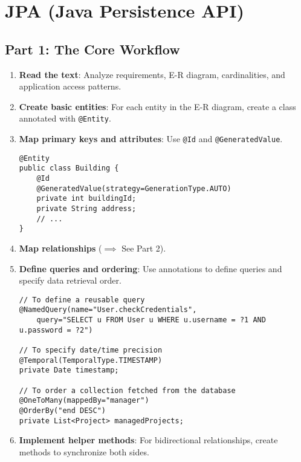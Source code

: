 
\section*{JPA (Java Persistence API)}

\subsection*{Part 1: The Core Workflow}
\begin{enumerate}
    \item \textbf{Read the text}: Analyze requirements, E-R diagram, cardinalities, and application access patterns.
    \item \textbf{Create basic entities}: For each entity in the E-R diagram, create a class annotated with \texttt{@Entity}.
    \item \textbf{Map primary keys and attributes}: Use \texttt{@Id} and \texttt{@GeneratedValue}.
    \begin{verbatim}
@Entity
public class Building {
    @Id 
    @GeneratedValue(strategy=GenerationType.AUTO)
    private int buildingId;
    private String address;
    // ...
}
    \end{verbatim}
    \item \textbf{Map relationships} ($\implies$ See Part 2).
    \item \textbf{Define queries and ordering}: Use annotations to define queries and specify data retrieval order.
    \begin{verbatim}
// To define a reusable query
@NamedQuery(name="User.checkCredentials", 
    query="SELECT u FROM User u WHERE u.username = ?1 AND u.password = ?2")

// To specify date/time precision
@Temporal(TemporalType.TIMESTAMP)
private Date timestamp;

// To order a collection fetched from the database
@OneToMany(mappedBy="manager")
@OrderBy("end DESC")
private List<Project> managedProjects;
    \end{verbatim}
    \item \textbf{Implement helper methods}: For bidirectional relationships, create methods to synchronize both sides.
\end{enumerate}

